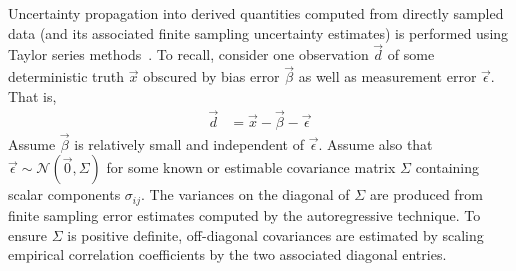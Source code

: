 Uncertainty propagation into derived quantities computed from directly sampled
data (and its associated finite sampling uncertainty estimates) is performed
using Taylor series methods~\citep{Ku1966Notes, Coleman2009Experimentation}.  To
recall, consider one observation $\vec{d}$  of some deterministic truth
$\vec{x}$ obscured by bias error $\vec{\beta}$ as well as measurement error
$\vec{\epsilon}$. That is,
\begin{align}
  \vec{d} &= \vec{x} - \vec{\beta} - \vec{\epsilon}
\end{align}
Assume $\vec{\beta}$ is relatively small and independent of $\vec{\epsilon}$.
Assume also that $\vec{\epsilon} \sim \mathcal{N}(\vec{0}, \Sigma)$ for some
known or estimable covariance matrix $\Sigma$ containing scalar components
$\sigma_{ij}$.
%
The variances on the diagonal of $\Sigma$ are produced from finite sampling
error estimates computed by the autoregressive technique.  To ensure
$\Sigma$ is positive definite, off-diagonal
covariances are estimated by scaling empirical correlation coefficients by
the two associated diagonal entries.

